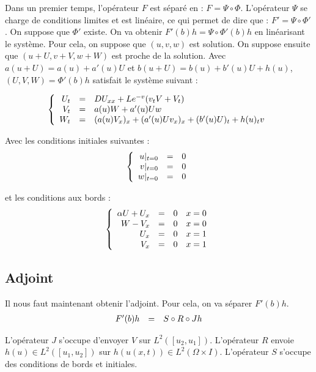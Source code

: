 \documentclass[a4paper,10pt]{article}
\begin{document}
Dans un premier temps, l'opérateur $F$ est séparé en : $F=\Psi \circ  \Phi$. L'opérateur $\Psi$ se charge de conditions limites et est linéaire, ce qui permet de dire que : $F'=\Psi \circ  \Phi '$. On suppose que $\Phi '$ existe.
On va obtenir $F'(b)h=\Psi \circ  \Phi'(b) h$ en linéarisant le système. Pour cela, on suppose que $(u,v,w)$ est solution. On suppose ensuite que $(u+U, v+V, w+W)$ est proche de la solution. Avec $a(u+U)=a(u)+a'(u)U$ et $b(u+U)=b(u)+b'(u)U+h(u)$, $(U,V,W)=\Phi'(b) h$ satisfait le système suivant :

\[
\left\{
\begin{array}{r c l}
U_t		&=&		D U_{xx} + L e^{-v} (v_t V +V_t)		\\
V_t		&=&		a(u)W + a'(u)Uw						\\
W_t		&=&		(a(u)V_x)_x + (a'(u)Uv_x)_x + (b'(u)U)_t + h(u)_t v\\
\end{array}
\right.
\]

Avec les conditions initiales suivantes :
\[
\left\{
\begin{array}{r c l}
u|_{t=0}		&=&		0		\\
v|_{t=0}		&=&		0		\\
w|_{t=0}		&=&		0		\\
\end{array}
\right.
\]

et les conditions aux bords :
\[
\left\{
\begin{array}{r c l c r}
\alpha U + U_x	&=&		0 	&	x = 0\\
W		- V_x 	&=&		0	&	x = 0\\
U_x	&=&		0 	&	x = 1\\
V_x 	&=&		0	&	x = 1\\
\end{array}
\right.
\]

\subsection{Adjoint}
Il nous faut maintenant obtenir l'adjoint. Pour cela, on va séparer $F'(b)h$.
\[
\begin{array}{l c r}
F'(b)h &=& S \circ R \circ J h \\
\end{array}
\]

L'opérateur $J$ s'occupe d'envoyer $V$ sur $L^2([u_2, u_1])$. L'opérateur $R$ 
envoie $h(u) \in L^2([u_1, u_2])$ sur $h(u(x,t)) \in L^2(\Omega \times I)$.  L'opérateur $S$ s'occupe des conditions de bords et initiales.
\end{document}
